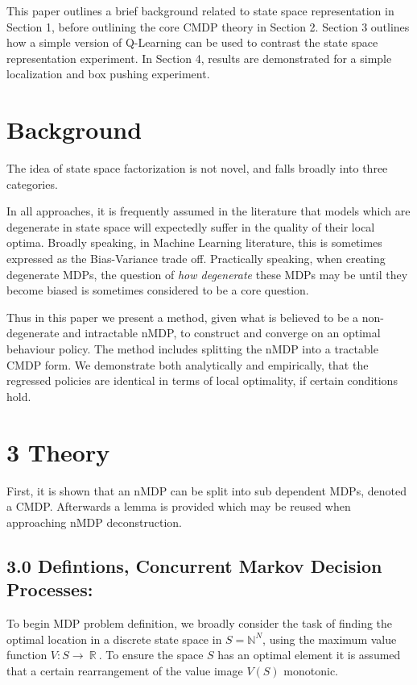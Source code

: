 \documentclass[]{article}
\begin{document}
This paper outlines a brief background related to state space
representation in Section 1, before outlining the core CMDP theory in
Section 2. Section 3 outlines how a simple version of Q-Learning can be
used to contrast the state space representation experiment. In Section
4, results are demonstrated for a simple localization and box pushing
experiment.

\section{Background}\label{background}

The idea of state space factorization is not novel, and falls broadly
into three categories.

In all approaches, it is frequently assumed in the literature that
models which are degenerate in state space will expectedly suffer in the
quality of their local optima. Broadly speaking, in Machine Learning
literature, this is sometimes expressed as the Bias-Variance trade off.
Practically speaking, when creating degenerate MDPs, the question of
\emph{how degenerate} these MDPs may be until they become biased is
sometimes considered to be a core question.

Thus in this paper we present a method, given what is believed to be a
non-degenerate and intractable nMDP, to construct and converge on an
optimal behaviour policy. The method includes splitting the nMDP into a
tractable CMDP form. We demonstrate both analytically and empirically,
that the regressed policies are identical in terms of local optimality,
if certain conditions hold.

\section{3 Theory}\label{theory}

First, it is shown that an nMDP can be split into sub dependent MDPs,
denoted a CMDP. Afterwards a lemma is provided which may be reused when
approaching nMDP deconstruction.

\subsection{3.0 Defintions, Concurrent Markov Decision
Processes:}\label{defintions-concurrent-markov-decision-processes}

To begin MDP problem definition, we broadly consider the task of finding
the optimal location in a discrete state space in
\(S = \mathbb{N}^{N}\), using the maximum value function
\(V:S\mathbb{\rightarrow \ R\ }\). To ensure the space \(S\) has an
optimal element it is assumed that a certain rearrangement of the value
image \(V\left( S \right)\) monotonic.
\end{document}
